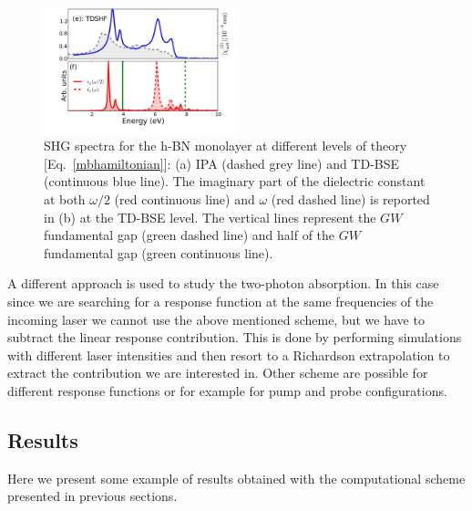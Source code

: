\begin{figure}
    \centering
\includegraphics[width=0.5\textwidth]{Figures/eps_and_X2_short}
	\caption{\footnotesize{SHG spectra for the h-BN monolayer at different levels of theory [Eq.~\eqref{mbhamiltonian}]: (a) IPA (dashed grey line) and TD-BSE (continuous blue line). The imaginary part of the dielectric constant at both $\omega/2$ (red continuous line) and $\omega$ (red dashed line) is reported in (b) at the  TD-BSE level. The vertical lines represent the $GW$ fundamental gap (green dashed line) and half of the $GW$ fundamental gap (green continuous line). \label{X2bn} }}
\end{figure}
A different approach is used to study the two-photon absorption. In this case since we are searching for a response function at the same frequencies of the incoming laser we cannot use the above mentioned scheme, but we have to subtract the linear response contribution. This is done by performing simulations with different laser intensities and then  resort to a Richardson extrapolation to extract the contribution we are interested in.\cite{attaccalite2018two} Other scheme are possible for different response functions or for example for pump and probe configurations.

\subsection{Results}\label{sc:results}
Here we present some example of results obtained with the computational scheme presented in previous sections.

